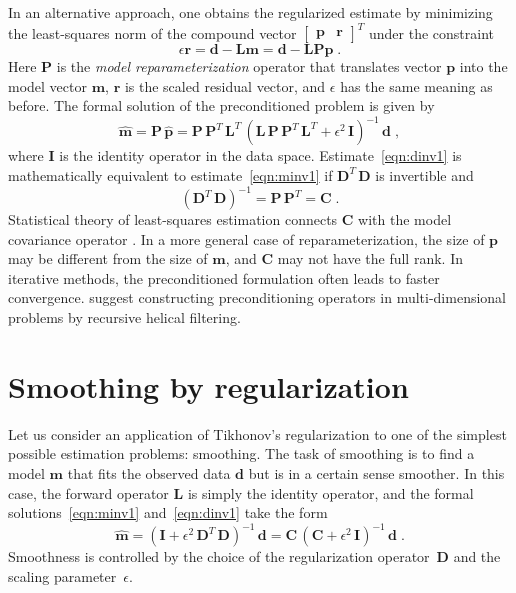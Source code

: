 In an alternative approach, one obtains the regularized estimate by
minimizing the least-squares norm of the compound vector
$\left[\begin{array}{cc} \mathbf{p} & \mathbf{r} \end{array}\right]^T$
under the constraint
\begin{equation}
  \epsilon \mathbf{r = d - L m = d - L P p}\;.
\label{eqn:r}
\end{equation}
Here $\mathbf{P}$ is the \emph{model reparameterization} operator that
translates vector $\mathbf{p}$ into the model vector $\mathbf{m}$,
$\mathbf{r}$ is the scaled residual vector, and $\epsilon$ has the
same meaning as before. The formal solution of the preconditioned
problem is given by
\begin{equation}
  \widehat{\mathbf{m}} = 
  \mathbf{P}\,\widehat{\mathbf{p}} =
  \mathbf{P}\,\mathbf{P}^T\,\mathbf{L}^T\,\left(
    \mathbf{L}\,\mathbf{P}\,\mathbf{P}^T\,\mathbf{L}^T +
    \epsilon^2\,\mathbf{I}\right)^{-1}\, \mathbf{d}\;,
  \label{eqn:dinv1}  
\end{equation}
where $\mathbf{I}$ is the identity operator in the data space.
Estimate~\ref{eqn:dinv1} is mathematically equivalent to
estimate~\ref{eqn:minv1} if 
$\mathbf{D}^T\,\mathbf{D}$ is invertible
and
\begin{equation}
  \label{eq:equiv}
 \left(\mathbf{D}^T\,\mathbf{D}\right)^{-1} = 
 \mathbf{P}\,\mathbf{P}^T  = \mathbf{C}\;.
\end{equation}
Statistical theory of least-squares estimation connects $\mathbf{C}$
with the model covariance operator \cite[]{tarantola}. In a more
general case of reparameterization, the size of $\mathbf{p}$ may be
different from the size of $\mathbf{m}$, and $\mathbf{C}$ may not have
the full rank. In iterative methods, the preconditioned formulation
often leads to faster convergence. \cite{GEO68-02-05770588} suggest
constructing preconditioning operators in multi-dimensional problems
by recursive helical filtering.


\section{Smoothing by regularization}
Let us consider an application of Tikhonov's regularization to one of the simplest
possible estimation problems: smoothing. The task of smoothing is to find a
model $\mathbf{m}$ that fits the observed data $\mathbf{d}$ but is in a
certain sense smoother. In this case, the forward operator $\mathbf{L}$ is
simply the identity operator, and the formal solutions~\ref{eqn:minv1} and~\ref{eqn:dinv1} take the form
\begin{equation}
  \widehat{\mathbf{m}} = 
  \left(\mathbf{I} +
    \epsilon^2\,\mathbf{D}^T\,\mathbf{D}\right)^{-1}\,\mathbf{d} =
  \mathbf{C}\,\left(\mathbf{C} +
    \epsilon^2\,\mathbf{I}\right)^{-1}\,\mathbf{d}\;.
  \label{eqn:msmoo}  
\end{equation}
Smoothness is controlled by the choice of the regularization
operator~$\mathbf{D}$ and the scaling parameter~$\epsilon$.

